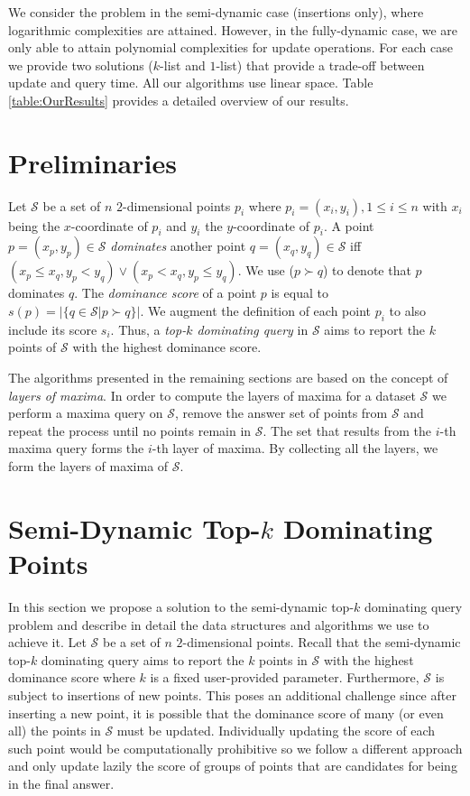 \documentclass{llncs}
\begin{document}
We consider the problem in the semi-dynamic case (insertions only), where logarithmic  complexities are attained. However, in the fully-dynamic case, we are only able to attain polynomial complexities for update operations. For each case we provide two solutions ($k$-list and $1$-list) that provide a trade-off between update and query time. All our algorithms use linear space. Table \ref{table:OurResults} provides a detailed  overview of our results.




\section{Preliminaries} \label{section:Preliminaries}

Let $\mathcal{S}$ be a set of $n$ $2$-dimensional points $p_i$ where $p_i=(x_{i},y_{i}),1\leq i\leq n$ with $x_{i}$ being the $x$-coordinate of $p_i$ and $y_{i}$ the $y$-coordinate of $p_i$. A point $p=(x_{p},y_{p})\in\mathcal{S}$ \emph{dominates} another point $q=(x_{q},y_{q})\in\mathcal{S}$ iff $(x_{p} \leq x_{q},y_{p}<y_{q})\vee(x_{p} < x_{q},y_{p}\leq y_{q})$. We use ($p \succ q$) to denote that $p$ dominates $q$. The \emph{dominance score} of a point $p$ is equal to $s(p) = |\{q \in \mathcal{S}| p \succ q\}|$. We augment the definition of each point $p_i$ to also include its score $s_i$.
Thus, a \emph{top-$k$ dominating query} in $\mathcal{S}$ aims to report the $k$ points of $\mathcal{S}$ with the highest dominance score.

The algorithms presented in the remaining sections are based on the concept of \emph{layers of maxima}. In order to compute the layers of maxima for a dataset $\mathcal{S}$ we perform a maxima query on $\mathcal{S}$, remove the answer set of points from $\mathcal{S}$ and repeat the process until no points remain in $\mathcal{S}$. The set that results from the $i$-th maxima query forms the $i$-th layer of maxima. By collecting all the layers, we form the layers of maxima of $\mathcal{S}$.







\section{Semi-Dynamic Top-$k$ Dominating Points} \label{section:SemiDynTopKDom}
In this section we propose a solution to the semi-dynamic top-$k$ dominating query problem and describe in detail the data structures and algorithms we use to achieve it.
Let $\mathcal{S}$ be a set of $n$ $2$-dimensional points. Recall that the semi-dynamic top-$k$ dominating query aims to report the $k$ points in $\mathcal{S}$ with the highest dominance score where $k$ is a fixed user-provided parameter. Furthermore, $\mathcal{S}$ is subject to insertions of new points. This poses an additional challenge since after inserting a new point, it is possible that the dominance score of many (or even all) the points in $\mathcal{S}$ must be updated. Individually updating the score of each such point would be computationally prohibitive so we follow a different approach and only update lazily the score of groups of points that are candidates for being in the final answer.
\end{document}
